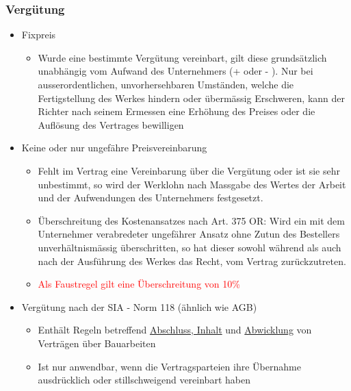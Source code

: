 \subsubsection{Vergütung}
\begin{itemize}
    \item Fixpreis
    \begin{itemize}
        \item Wurde eine bestimmte Vergütung vereinbart, gilt diese grundsätzlich unabhängig vom Aufwand des Unternehmers (+ oder - ). Nur bei ausserordentlichen, unvorhersehbaren Umständen, welche die Fertigstellung des Werkes hindern oder übermässig Erschweren, kann der Richter nach seinem Ermessen eine Erhöhung des Preises oder die Auflösung des Vertrages bewilligen
    \end{itemize}
    \item Keine oder nur ungefähre Preisvereinbarung
    \begin{itemize}
        \item Fehlt im Vertrag eine Vereinbarung über die Vergütung oder ist sie sehr unbestimmt, so wird der Werklohn nach Massgabe des Wertes der Arbeit und der Aufwendungen des Unternehmers festgesetzt.
        \item Überschreitung des Kostenansatzes nach Art. 375 OR: Wird ein mit dem Unternehmer verabredeter ungefährer Ansatz ohne Zutun des Bestellers unverhältnismässig überschritten, so hat dieser sowohl während als auch nach der Ausführung des Werkes das Recht, vom Vertrag zurückzutreten.
        \item \textcolor{red}{Als Faustregel gilt eine Überschreitung von 10\%}
    \end{itemize}
    \item Vergütung nach der SIA - Norm 118 (ähnlich wie AGB)
    \begin{itemize}
        \item Enthält Regeln betreffend \underline{Abschluss, Inhalt} und \underline{Abwicklung} von Verträgen über Bauarbeiten
        \item Ist nur anwendbar, wenn die Vertragsparteien ihre Übernahme ausdrücklich oder stillschweigend vereinbart haben
    \end{itemize}
\end{itemize}


